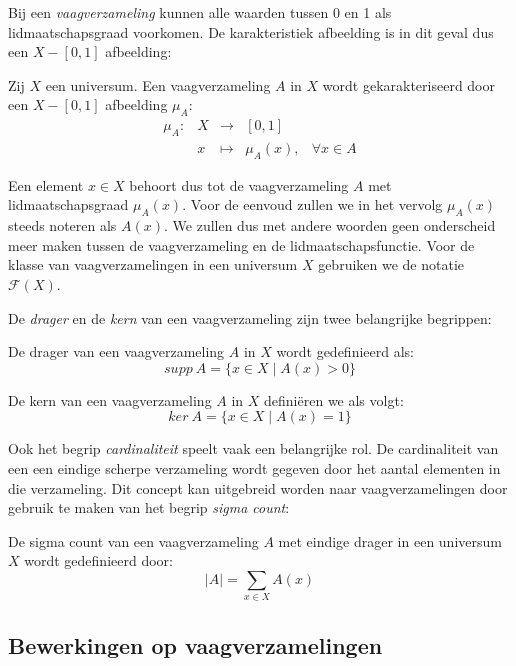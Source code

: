 Bij een \emph{vaagverzameling} kunnen alle waarden tussen 0 en 1 als lidmaatschapsgraad 
voorkomen. De karakteristiek afbeelding is in dit geval dus een $X - [0,1]$ afbeelding:
\begin{definitie}
Zij $X$ een universum. Een vaagverzameling $A$ in $X$ wordt gekarakteriseerd door een $X - [0,1]$
afbeelding  $\mu_A$:
$$
\begin{array}{lllll}
\mu_A: 	& X & \to 		& [0,1]	& \\
		& x & \mapsto 	& \mu_A(x),		& \forall x \in A
\end{array}
$$
\end{definitie}
\noindent
Een element $x \in X$ behoort dus tot de vaagverzameling $A$ met lidmaatschapsgraad $\mu_A(x)$.
Voor de eenvoud zullen we in het vervolg $\mu_A(x)$ steeds noteren als $A(x)$. We zullen dus 
met andere woorden geen onderscheid meer maken tussen de vaagverzameling en de 
lidmaatschapsfunctie. Voor de klasse van vaagverzamelingen in een universum $X$ gebruiken we
de notatie $\mathcal{F}(X)$.

De \emph{drager} en de \emph{kern} van een vaagverzameling zijn twee belangrijke begrippen: 
\begin{definitie}
De drager van een vaagverzameling $A$ in $X$ wordt gedefinieerd als:
$$
supp\ A = \{x \in X \mid A(x) > 0\} 
$$
\end{definitie}
\begin{definitie}
De kern van een vaagverzameling $A$ in $X$ defini\"eren we als volgt:
$$
ker\ A = \{x \in X \mid A(x) = 1\}
$$
\end{definitie}
\noindent
Ook het begrip \emph{cardinaliteit} speelt vaak een belangrijke rol. De cardinaliteit van een 
een eindige scherpe verzameling wordt gegeven door het aantal elementen in die verzameling. 
Dit concept kan uitgebreid worden naar vaagverzamelingen door gebruik te maken van het begrip 
\emph{sigma count}:
\begin{definitie}
De sigma count van een vaagverzameling $A$ met eindige drager in een universum $X$ wordt
gedefinieerd door:
$$
|A|=\sum_{x \in X} A(x)
$$
\end{definitie}

\subsection{Bewerkingen op vaagverzamelingen}
\label{sectie:bew_op_vaagverz}

